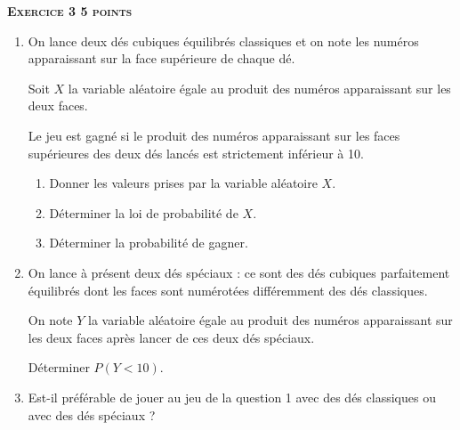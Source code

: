 \textbf{\large\textsc{Exercice 3 \hfill 5 points}}

\bigskip

\begin{enumerate}
\item On lance deux dés cubiques équilibrés \og classiques \fg{} et on note les numéros apparaissant sur la face supérieure de chaque dé.

Soit $X$ la variable aléatoire égale au produit des numéros apparaissant sur les deux faces.

Le jeu est gagné si le produit des numéros apparaissant sur les faces supérieures des deux
dés lancés est strictement inférieur à 10.

\medskip

\begin{enumerate}
\item Donner les valeurs prises par la variable aléatoire $X$.
\item Déterminer la loi de probabilité de  $X$.
\item Déterminer la probabilité de gagner.
\end{enumerate}

\item On lance à présent deux dés spéciaux : ce sont des dés cubiques parfaitement équilibrés dont les faces sont numérotées différemment des dés classiques.


On note $Y$ la variable aléatoire égale au produit des numéros apparaissant sur les deux faces après lancer de ces deux dés spéciaux.

Déterminer $P(Y < 10)$.

\item Est-il préférable de jouer au jeu de la question 1 avec des dés classiques ou avec des dés
spéciaux ?
\end{enumerate}

\vspace{0.5cm}

